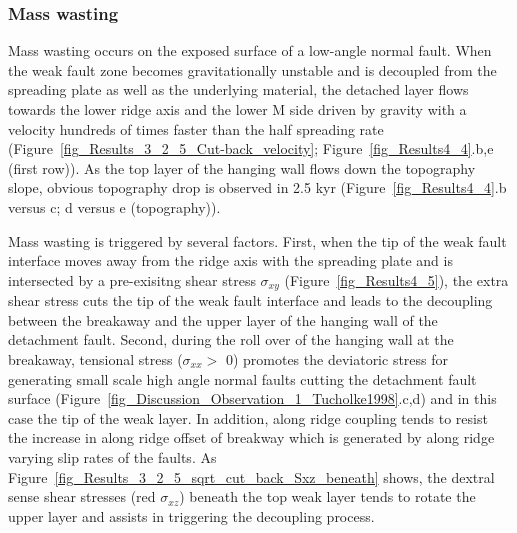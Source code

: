 \documentclass[draft,gc]{agutex}
\begin{document}
\begin{article}
\subsubsection{Mass wasting}\label{para_CutBack}
Mass wasting occurs on the exposed surface of a low-angle normal fault. When the weak fault zone becomes gravitationally unstable and is decoupled from the spreading plate as well as the underlying material, the detached layer flows towards the lower ridge axis and the lower M side driven by gravity with a velocity hundreds of times faster than the half spreading rate (Figure~\ref{fig_Results_3_2_5_Cut-back_velocity}; Figure~\ref{fig_Results4_4}.b,e (first row)). As the top layer of the hanging wall flows down the topography slope, obvious topography drop is observed in 2.5 kyr (Figure~\ref{fig_Results4_4}.b versus c; d versus e (topography)).

Mass wasting is triggered by several factors. First, when the tip of the weak fault interface moves away from the ridge axis with the spreading plate and is intersected by a pre-exisitng shear stress $\sigma_{xy}$ (Figure~\ref{fig_Results4_5}), the extra shear stress cuts the tip of the weak fault interface and leads to the decoupling between the breakaway and the upper layer of the hanging wall of the detachment fault. Second, during the roll over of the hanging wall at the breakaway, tensional stress ($\sigma_{xx} >$ 0) promotes the deviatoric stress for generating small scale high angle normal faults cutting the detachment fault surface \citep{Tucholke1998} (Figure~\ref{fig_Discussion_Observation_1_Tucholke1998}.c,d) and in this case the tip of the weak layer. In addition, along ridge coupling tends to resist the increase in along ridge offset of breakway which is generated by along ridge varying slip rates of the faults. As Figure~\ref{fig_Results_3_2_5_sqrt_cut_back_Sxz_beneath} shows, the dextral sense shear stresses (red $\sigma_{xz}$) beneath the top weak layer tends to rotate the upper layer and assists in triggering the decoupling process.


\end{article}
\end{document}
